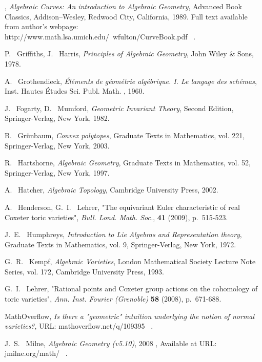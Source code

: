 \documentclass[BSc]{usydthesis}
\numberwithin{equation}{chapter}
\theoremstyle{remark}
\begin{document}
\begin{thebibliography}{10}
\vrule height 2pt depth -1.6pt width 23pt, {\em Algebraic Curves: An introduction to Algebraic Geometry}, Advanced Book Classics, Addison--Wesley, Redwood City, California, 1989. Full text available from author's webpage: http://www.math.lsa.umich.edu/~wfulton/CurveBook.pdf ~.

{\sc P.~ Griffiths, J.~ Harris}, {\em Principles of Algebraic Geometry}, John Wiley \& Sons, 1978.

{\sc A.~ Grothendieck}, {\em \'{E}l\'{e}ments de g\'{e}om\'{e}trie alg\'{e}brique. I. Le langage des sch\'{e}mas}, Inst. Hautes \'{E}tudes Sci. Publ. Math. , 1960. 

{\sc J.~ Fogarty, D.~ Mumford}, {\em Geometric Invariant Theory}, Second Edition, Springer-Verlag, New York, 1982.

{\sc B.~ Gr\"unbaum}, {\em Convex polytopes}, Graduate Texts in Mathematics, vol. 221, Springer-Verlag, New York, 2003. 

{\sc R.~ Hartshorne}, {\em Algebraic Geometry}, Graduate Texts in Mathematics, vol. 52, Springer-Verlag, New York, 1997.

{\sc A.~ Hatcher}, {\em Algebraic Topology}, Cambridge University Press, 2002. 

{\sc A.~ Henderson, G.~I.~ Lehrer}, "The equivariant Euler characteristic of real Coxeter toric varieties", {\em Bull. Lond. Math. Soc.}, {\bf 41} (2009), p.~515-523.

{\sc J.~E.~ Humphreys}, {\em Introduction to Lie Algebras and Representation theory}, Graduate Texts in Mathematics, vol. 9, Springer-Verlag, New York, 1972.

{\sc G.~R.~ Kempf}, {\em Algebraic Varieties}, London Mathematical Society Lecture Note Series, vol. 172, Cambridge University Press, 1993.

{\sc G.~I.~ Lehrer}, "Rational points and Coxeter group actions on the cohomology of toric varieties", {\em Ann. Inst. Fourier (Grenoble)} {\bf 58} (2008), p.~671-688.


{\sc MathOverflow}, {\em Is there a "geometric" intuition underlying the notion of normal varieties?}, URL: mathoverflow.net/q/109395 ~.

{\sc J.~S.~ Milne}, {\em Algebraic Geometry (v5.10)}, 2008 , Available at URL: jmilne.org/math/ ~.


\end{thebibliography}
\end{document}

